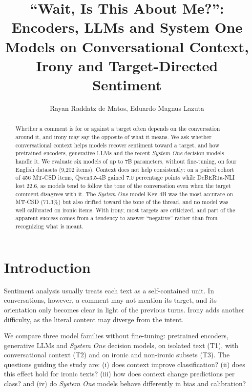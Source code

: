 \documentclass[12pt]{article}
\date{}
\title{``Wait, Is This About Me?'': Encoders, LLMs and System One Models on Conversational Context, Irony and Target-Directed Sentiment}
\begin{document}
\makeatletter
\let\orgtitle\@title
\makeatother

\title{\orgtitle}

\author{
   Rayan Raddatz de Matos,
   Eduardo Magnus Lazuta}

\address{
   Instituto de Informática -- Universidade Federal do Rio Grande do Sul (UFRGS)\\
   Caixa Postal 15.064 -- 91.501-970 -- Porto Alegre -- RS -- Brazil
   ,
   }

\maketitle
\begin{abstract}
Whether a comment is for or against a target often depends on the conversation around it, and irony may say the opposite of what it means. We ask whether conversational context helps models recover sentiment toward a target, and how pretrained encoders, generative LLMs and the recent \emph{System One} decision models handle it. We evaluate six models of up to 7B parameters, without fine-tuning, on four English datasets (9,202 items). Context does not help consistently: on a paired cohort of 456 MT-CSD items, Qwen3.5-4B gained 7.0 percentage points while DeBERTa-NLI lost 22.6, as models tend to follow the tone of the conversation even when the target comment disagrees with it. The \emph{System One} model Kev-4B was the most accurate on MT-CSD (71.3\%) but also drifted toward the tone of the thread, and no model was well calibrated on ironic items. With irony, most targets are criticized, and part of the apparent success comes from a tendency to answer ``negative'' rather than from recognizing what is meant.
\end{abstract}

\section{Introduction}
\label{sec:orged62fcf}

Sentiment analysis usually treats each text as a self-contained unit. In conversations, however, a comment may not mention its target, and its orientation only becomes clear in light of the previous turns. Irony adds another difficulty, as the literal content may diverge from the intent.

We compare three model families without fine-tuning: pretrained encoders, generative LLMs and \emph{System One} decision models, on isolated text (T1), with conversational context (T2) and on ironic and non-ironic subsets (T3). The questions guiding the study are: (i) does context improve classification? (ii) does this effect hold for ironic texts? (iii) how does context change predictions per class? and (iv) do \emph{System One} models behave differently in bias and calibration?
\end{document}
